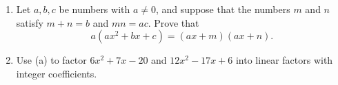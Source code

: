 \begin{enumerate}
\item[(a)] Let $a,b,c$ be numbers with $a\ne0$, and suppose that the numbers $m$ and $n$ satisfy $m+n=b$ and $mn=ac$. Prove that
\[a\left(ax^2+bx+c\right)=(ax+m)(ax+n).\]
\item[(b)] Use (a) to factor $6x^2+7x-20$ and $12x^2-17x+6$ into linear factors with integer coefficients.
\end{enumerate}
